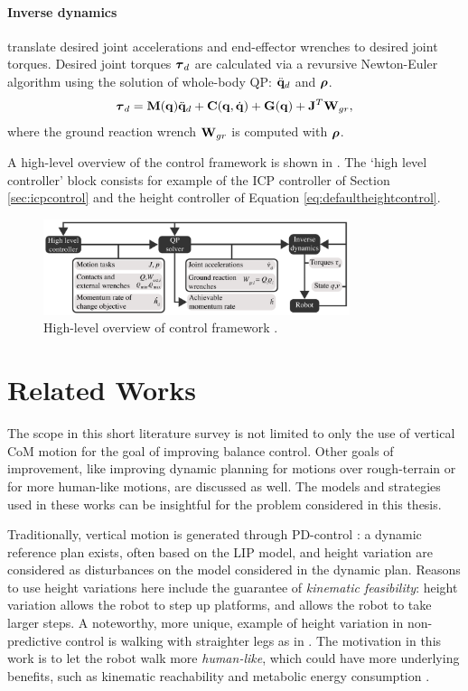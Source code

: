 \paragraph{Inverse dynamics} translate desired joint accelerations and end-effector wrenches to desired joint torques. Desired joint torques $\boldsymbol{\tau}_d$ are calculated via a revursive Newton-Euler algorithm using the solution of whole-body \ac{QP}: $\ddot{\mathbf{q}}_d$ and $\boldsymbol{\rho}$.
\begin{equation}
    \boldsymbol{\tau}_d = \mathbf{M}(\mathbf{q})\ddot{\mathbf{q}}_d + \mathbf{C}(\mathbf{q},\dot{\mathbf{q}}) + \mathbf{G}(\mathbf{q}) + \mathbf{J}^T \mathbf{W}_{gr},
\end{equation}
where the ground reaction wrench $\mathbf{W}_{gr}$ is computed with $\boldsymbol{\rho}$. 

A high-level overview of the control framework is shown in . The `high level controller' block consists for example of the \ac{ICP} controller of Section \ref{sec:icpcontrol} and the height controller of Equation \ref{eq:defaultheightcontrol}.
\begin{figure}[h]
\centering
\includegraphics[width=0.8\textwidth]{STYLESTUFF/controlframework.png}
\caption{High-level overview of control framework \cite{koolen2016design}. }
\label{fig:framework}
\end{figure}

\section{Related Works}\label{sec:relatedworksheight}
The scope in this short literature survey is not limited to only the use of vertical \ac{CoM} motion for the goal of improving balance control. Other goals of improvement, like improving dynamic planning for motions over rough-terrain or for more human-like motions, are discussed as well. The models and strategies used in these works can be insightful for the problem considered in this thesis.

Traditionally, vertical motion is generated through PD-control \cite{kajita2003resolved, koolen2016design}: a dynamic reference plan exists, often based on the LIP model, and height variation are considered as disturbances on the model considered in the dynamic plan. Reasons to use height variations here include the guarantee of \textit{kinematic feasibility}: height variation allows the robot to step up platforms, and allows the robot to take larger steps. A noteworthy, more unique, example of height variation in non-predictive control is walking with straighter legs as in \cite{griffin2018straight}. The motivation in this work is to let the robot walk more \textit{human-like}, which could have more underlying benefits, such as kinematic reachability and metabolic energy consumption \cite{wang2012optimizing}.

